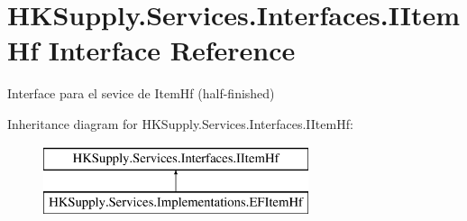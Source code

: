 \hypertarget{interface_h_k_supply_1_1_services_1_1_interfaces_1_1_i_item_hf}{}\section{H\+K\+Supply.\+Services.\+Interfaces.\+I\+Item\+Hf Interface Reference}
\label{interface_h_k_supply_1_1_services_1_1_interfaces_1_1_i_item_hf}


Interface para el sevice de Item\+Hf (half-\/finished)  


Inheritance diagram for H\+K\+Supply.\+Services.\+Interfaces.\+I\+Item\+Hf\+:\begin{figure}[H]
\begin{center}
\leavevmode
\includegraphics[height=2.000000cm]{interface_h_k_supply_1_1_services_1_1_interfaces_1_1_i_item_hf}
\end{center}
\end{figure}
